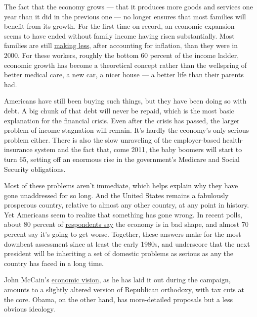 The fact that the economy grows --- that it produces more goods and
services one year than it did in the previous one --- no longer ensures
that most families will benefit from its growth. For the first time on
record, an economic expansion seems to have ended without family income
having risen substantially. Most families are still
\href{http://www.census.gov/hhes/www/income/histinc/f07ar.html}{making
less}, after accounting for inflation, than they were in 2000. For these
workers, roughly the bottom 60 percent of the income ladder, economic
growth has become a theoretical concept rather than the wellspring of
better medical care, a new car, a nicer house --- a better life than
their parents had.

Americans have still been buying such things, but they have been doing
so with debt. A big chunk of that debt will never be repaid, which is
the most basic explanation for the financial crisis. Even after the
crisis has passed, the larger problem of income stagnation will remain.
It's hardly the economy's only serious problem either. There is also the
slow unraveling of the employer-based health-insurance system and the
fact that, come 2011, the baby boomers will start to turn 65, setting
off an enormous rise in the government's Medicare and Social Security
obligations.

Most of these problems aren't immediate, which helps explain why they
have gone unaddressed for so long. And the United States remains a
fabulously prosperous country, relative to almost any other country, at
any point in history. Yet Americans seem to realize that something has
gone wrong. In recent polls, about 80 percent of
\href{http://nytimes3xbfgragh.onion/polls}{respondents say} the economy
is in bad shape, and almost 70 percent say it's going to get worse.
Together, these answers make for the most downbeat assessment since at
least the early 1980s, and underscore that the next president will be
inheriting a set of domestic problems as serious as any the country has
faced in a long time.

John McCain's
\href{http://www.johnmccain.com/Informing/News/Speeches/4c980d5b-dfd3-40a3-9663-7d14df1f1468.htm}{economic
vision}, as he has laid it out during the campaign, amounts to a
slightly altered version of Republican orthodoxy, with tax cuts at the
core. Obama, on the other hand, has more-detailed proposals but a less
obvious ideology.

